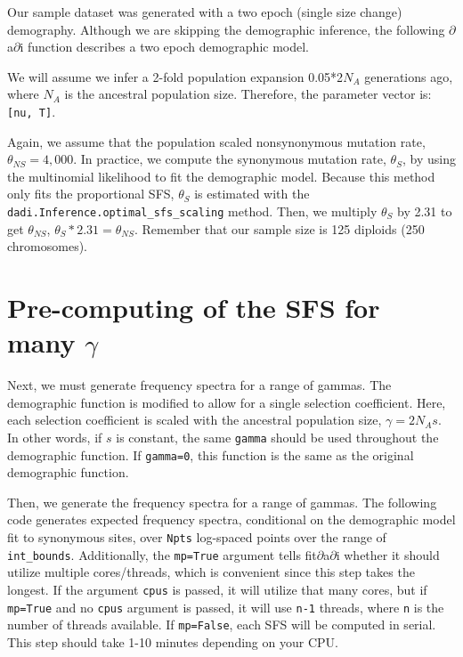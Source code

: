 \documentclass[11pt]{article}
\begin{document}
Our sample dataset was generated with a two epoch (single size change) demography. Although we are skipping the demographic inference, the following $\partial$a$\partial$i function describes a two epoch demographic model.



We will assume we infer a 2-fold population expansion 0.05*2$N_A$ generations ago, where $N_A$ is the ancestral population size. Therefore, the parameter vector is: \texttt{[nu, T]}.



Again, we assume that the population scaled nonsynonymous mutation rate, $\theta_{NS}=4,000$. In practice, we compute the synonymous mutation rate, $\theta_S$, by using the multinomial likelihood to fit the demographic model. Because this method only fits the proportional SFS, $\theta_S$ is estimated with the \texttt{dadi.Inference.optimal\_sfs\_scaling} method. Then, we multiply $\theta_S$ by 2.31 to get $\theta_{NS}$, $\theta_S * 2.31 = \theta_{NS}$. Remember that our sample size is 125 diploids (250 chromosomes).



\section{Pre-computing of the SFS for many $\gamma$}

Next, we must generate frequency spectra for a range of gammas. The demographic function is modified to allow for a single selection coefficient. Here, each selection coefficient is scaled with the ancestral population size, $\gamma=2N_As$. In other words, if $s$ is constant, the same \texttt{gamma} should be used throughout the demographic function. If \texttt{gamma=0}, this function is the same as the original demographic function. 



Then, we generate the frequency spectra for a range of gammas. The following code generates expected frequency spectra, conditional on the demographic model fit to synonymous sites, over \texttt{Npts} log-spaced points over the range of \texttt{int\_bounds}. Additionally, the \texttt{mp=True} argument tells fit$\partial$a$\partial$i whether it should utilize multiple cores/threads, which is convenient since this step takes the longest. If the argument \texttt{cpus} is passed, it will utilize that many cores, but if \texttt{mp=True} and no \texttt{cpus} argument is passed, it will use \texttt{n-1} threads, where \texttt{n} is the number of threads available. If \texttt{mp=False}, each SFS will be computed in serial. This step should take 1-10 minutes depending on your CPU.
\end{document}
